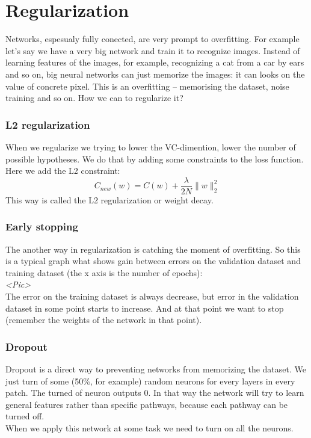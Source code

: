 \section{Regularization}

Networks, espesualy fully conected, are very prompt to overfitting. For example let's say we have a very big network and train it to recognize images. Instead of learning features of the images, for example, recognizing a cat from a car by ears and so on, big neural networks can just memorize the images: it can looks on the value of concrete pixel. This is an overfitting -- memorising the dataset,  noise training and so on. How we can to regularize it? 

\subsubsection*{L2 regularization}

When we regularize we trying to lower the VC-dimention, lower the number of possible hypotheses. We do that by adding some constraints to the loss function. Here we add the L2 constraint:
$$C_{new}(w)=C(w)+\frac{\lambda}{2N}\|w\|_2^2$$
This way is called the L2 regularization or weight decay.\\
{\it <Some intuition why it works>} %

\subsubsection*{Early stopping}

The another way in regularization is catching the moment of overfitting. So this is a typical graph what shows gain between errors on the validation dataset and training dataset (the x axis is the number of epochs):\\
{\it <Pic>}\\
The error on the training dataset is always decrease, but error in the validation dataset in some point starts to increase. And at that point we want to stop (remember the weights of the network in that point).

\subsubsection*{Dropout}

Dropout is a direct way to preventing networks from memorizing the dataset. We just turn of some (50\%, for example) random neurons for every layers in every patch. The turned of neuron outputs 0. In that way the network will try to learn general features rather than specific pathways, because each pathway can be turned off.\\
When we apply this network at some task we need to turn on all the neurons.

